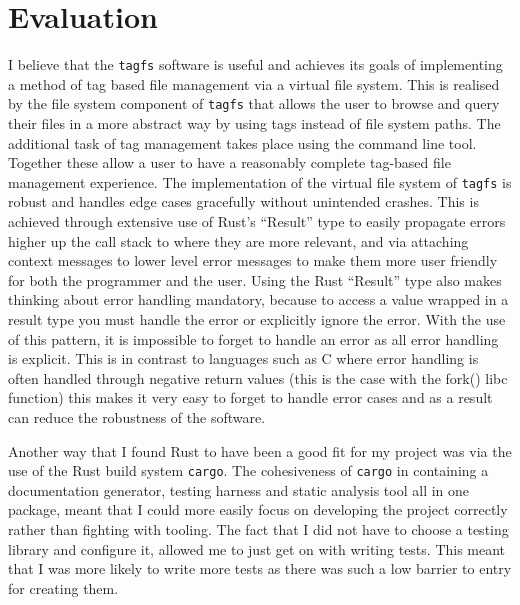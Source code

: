 \chapter{Evaluation}
\label{chap:evaluation}
\vspace{1cm}

I believe that the \texttt{tagfs} software is useful and achieves its goals of
implementing a method of tag based file management via a virtual file system.
This is realised by the file system component of \texttt{tagfs} that allows the
user to browse and query their files in a more abstract way by using tags
instead of file system paths. The additional task of tag management takes place
using the command line tool. Together these allow a user to have a reasonably
complete tag-based file management experience. The implementation of the
virtual file system of \texttt{tagfs} is robust and handles edge cases
gracefully without unintended crashes. This is achieved through extensive use
of Rust's ``Result'' type to easily propagate errors higher up the call stack
to where they are more relevant, and via attaching context messages to lower
level error messages to make them more user friendly for both the programmer
and the user. Using the Rust ``Result'' type also makes thinking about error
handling mandatory, because to access a value wrapped in a result type you must
handle the error or explicitly ignore the error. With the use of this pattern,
it is impossible to forget to handle an error as all error handling is
explicit. This is in contrast to languages such as C where error handling is
often handled through negative return values (this is the case with the fork()
libc function) this makes it very easy to forget to handle error cases and as a
result can reduce the robustness of the software.

Another way that I found Rust to have been a good fit for my project was via
the use of the Rust build system \texttt{cargo}. The cohesiveness of
\texttt{cargo} in containing a documentation generator, testing harness and
static analysis tool all in one package, meant that I could more easily focus
on developing the project correctly rather than fighting with tooling. The fact
that I did not have to choose a testing library and configure it, allowed me to
just get on with writing tests. This meant that I was more likely to write more
tests as there was such a low barrier to entry for creating them.

